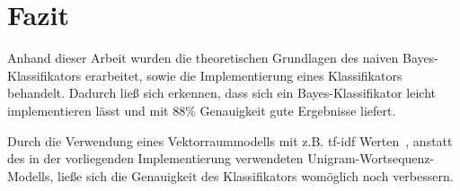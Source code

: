 \section{Fazit}
    Anhand dieser Arbeit wurden die theoretischen Grundlagen des naiven Bayes-Klassifikators erarbeitet, sowie die Implementierung eines Klassifikators behandelt. 
    Dadurch ließ sich erkennen, dass sich ein Bayes-Klassifikator leicht implementieren lässt und mit 88\% Genauigkeit gute Ergebnisse liefert.

    Durch die Verwendung eines Vektorraummodells mit z.B. tf-idf Werten~\cite{IIR}, anstatt des in der vorliegenden Implementierung verwendeten Unigram-Wortsequenz-Modells, ließe sich die Genauigkeit des Klassifikators womöglich noch verbessern.

